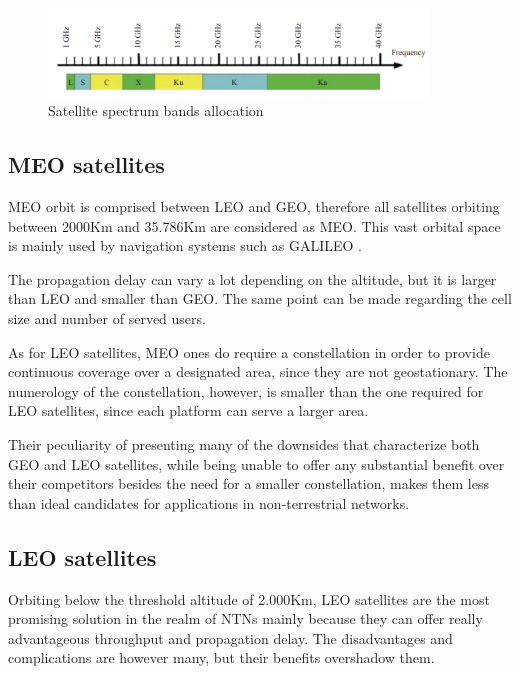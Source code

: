 \begin{figure}[ht]
    \centering
    \includegraphics[width=0.9\textwidth]{res/satellite-bands.png}
    \caption{Satellite spectrum bands allocation \cite{advances-comm-sat-sys}}
    \label{fig:satellite-bands}
\end{figure}

\subsection{MEO satellites}
\ac{MEO} orbit is comprised between \ac{LEO} and \ac{GEO}, therefore all satellites orbiting between 2000Km and 35.786Km are considered as \ac{MEO}. This vast orbital space is mainly used by navigation systems such as GALILEO \cite{types-of-orbits-esa}.

The propagation delay can vary a lot depending on the altitude, but it is larger than \ac{LEO} and smaller than \ac{GEO}. The same point can be made regarding the cell size and number of served users. 

As for \ac{LEO} satellites, \ac{MEO} ones do require a constellation in order to provide continuous coverage over a designated area, since they are not geostationary. The numerology of the constellation, however, is smaller than the one required for \ac{LEO} satellites, since each platform can serve a larger area.

Their peculiarity of presenting many of the downsides that characterize both \ac{GEO} and \ac{LEO} satellites, while being unable to offer any substantial benefit over their competitors besides the need for a smaller constellation, makes them less than ideal candidates for applications in non-terrestrial networks.

\subsection{LEO satellites}
\label{sec:leo}
Orbiting below the threshold altitude of 2.000Km, \ac{LEO} satellites are the most promising solution in the realm of \ac{NTNs} mainly because they can offer really advantageous throughput and propagation delay. The disadvantages and complications are however many, but their benefits overshadow them.

